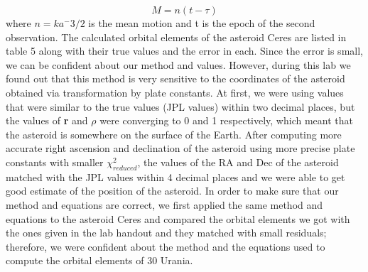 \documentclass[letterpaper,12pt]{article}
\begin{document}
\begin{equation}
M = n(t-\tau)
\end{equation}
where \begin{math} n=ka^-3/2 \end{math} is the mean motion and t is the epoch of the second observation. The calculated orbital elements of the asteroid Ceres are listed in table 5 along with their true values and the error in each. Since the error is small, we can be confident about our method and values. However, during this lab we found out that this method is very sensitive to the coordinates of the asteroid obtained via transformation by plate constants. At first, we were using values that were similar to the true values (JPL values) within two decimal places, but the values of {\bf r} and \begin{math} \rho \end{math} were converging to 0 and 1 respectively, which meant that the asteroid is somewhere on the surface of the Earth. After computing more accurate right ascension and declination of the asteroid using more precise plate constants with smaller \begin{math} \chi_{reduced}^2 \end{math}, the values of the RA and Dec of the asteroid matched with the JPL values within 4 decimal places and we were able to get good estimate of the position of the asteroid.
In order to make sure that our method and equations are correct, we first applied the same method and equations to the asteroid Ceres and compared the orbital elements we got with the ones given in the lab handout and they matched with small residuals; therefore, we were confident about the method and the equations used to compute the orbital elements of 30 Urania.
\end{document}
